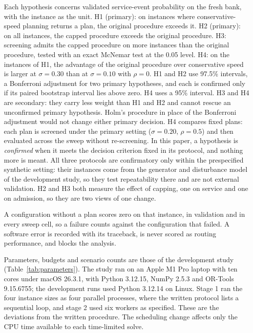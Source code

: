 \documentclass[11pt,a4paper]{article}
\begin{document}
Each hypothesis concerns validated service-event probability on the fresh bank,
with the instance as the unit. H1 (primary): on instances where
conservative-speed planning returns a plan, the original procedure exceeds it.
H2 (primary): on all instances, the capped procedure exceeds the original
procedure. H3: screening admits the capped procedure on more instances than the
original procedure, tested with an exact McNemar test at the 0.05 level. H4: on
the instances of H1, the advantage of the original procedure over conservative
speed is larger at $\sigma=0.30$ than at $\sigma=0.10$ with $\rho=0$. H1 and H2
use 97.5\% intervals, a Bonferroni adjustment for two primary hypotheses, and
each is confirmed only if its paired bootstrap interval lies above zero. H4 uses
a 95\% interval. H3 and H4 are secondary: they carry less weight than H1 and H2
and cannot rescue an unconfirmed primary hypothesis. Holm's procedure in place
of the Bonferroni adjustment would not change either primary decision. H4
compares fixed plans: each plan is screened under the primary setting
($\sigma=0.20$, $\rho=0.5$) and then evaluated across the sweep without
re-screening. In this paper, a hypothesis is \emph{confirmed} when it meets the
decision criterion fixed in its protocol, and nothing more is meant. All three
protocols are confirmatory only within the prespecified synthetic setting: their
instances come from the generator and disturbance model of the development
study, so they test repeatability there and are not external validation. H2
and H3 both measure the effect of capping, one on service and one on admission,
so they are two views of one change.

A configuration without a plan scores zero on that instance, in validation and
in every sweep cell, so a failure counts against the configuration that failed.
A software error is recorded with its traceback, is never scored as routing
performance, and blocks the analysis.

Parameters, budgets and scenario counts are those of the development study
(Table~\ref{tab:parameters}). The study ran on an Apple M1 Pro laptop with ten
cores under macOS 26.3.1, with Python 3.12.15, NumPy 2.5.3 and OR-Tools
9.15.6755; the development runs used Python 3.12.14 on Linux. Stage 1 ran the
four instance sizes as four parallel processes, where the written protocol lists
a sequential loop, and stage 2 used six workers as specified. These are the
deviations from the written procedure. The scheduling change affects only the CPU
time available to each time-limited solve.
\end{document}
